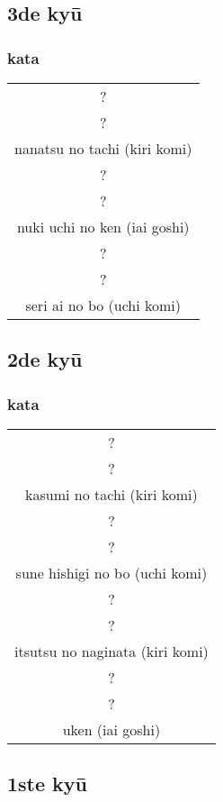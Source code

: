 \documentclass[a4paper, 12pt]{article}
\begin{document}
\subsection{3de ky\={u}}
\subsubsection{kata}
\begin{table}[H]
\begin{center}
\begin{tabular}{c}
?\\
?\\
nanatsu no tachi (kiri komi)\\
\hline
?\\
?\\
nuki uchi no ken (iai goshi)\\
\hline
?\\
?\\
seri ai no bo (uchi komi)
\end{tabular}
\end{center}
\label{kyuu_3_katori_kata}
\end{table}

\subsection{2de ky\={u}}
\subsubsection{kata}
\begin{table}[H]
\begin{center}
\begin{tabular}{c}
?\\
?\\
kasumi no tachi (kiri komi)\\
\hline
?\\
?\\
sune hishigi no bo (uchi komi)\\
\hline
?\\
?\\
itsutsu no naginata (kiri komi)\\
\hline
?\\
?\\
uken (iai goshi)
\end{tabular}
\end{center}
\label{kyuu_2_katori_kata}
\end{table}

\subsection{1ste ky\={u}}
\end{document}
